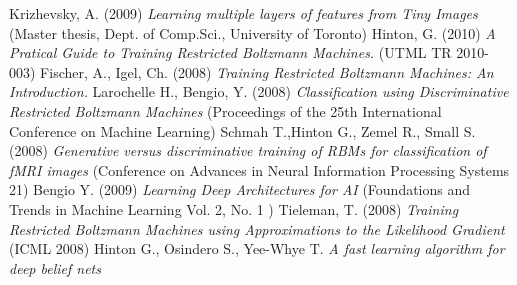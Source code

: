 \documentclass[a4paper]{scrartcl}
\begin{document}
\begin{thebibliography}{9}
    Krizhevsky, A. (2009) \emph{Learning multiple layers of features from Tiny Images} (Master thesis, Dept. of Comp.Sci., University of Toronto)
    Hinton, G. (2010) \emph{A Pratical Guide to Training Restricted Boltzmann Machines.} (UTML TR 2010-003)
    Fischer, A., Igel, Ch. (2008) \emph{Training Restricted Boltzmann Machines: An Introduction.} 
    Larochelle H., Bengio, Y. (2008) \emph {Classification using Discriminative Restricted Boltzmann Machines} (Proceedings of the 25th International Conference on Machine Learning)
    Schmah T.,Hinton G., Zemel R., Small S. (2008) \emph{Generative versus discriminative training of RBMs
for classification of fMRI images} (Conference on Advances in Neural Information Processing Systems 21)
	 Bengio Y. (2009) \emph {Learning Deep Architectures for AI} (Foundations and Trends in Machine Learning
Vol. 2, No. 1 )
	 Tieleman, T. (2008) \emph{Training Restricted Boltzmann Machines using Approximations to
the Likelihood Gradient} (ICML 2008)	
	 Hinton G., Osindero S., Yee-Whye T. \emph {A fast learning algorithm for deep belief nets}
\end{thebibliography}
\end{document}
